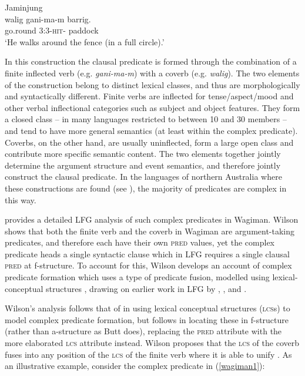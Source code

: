 \documentclass[output=paper,hidelinks]{langscibook}
\begin{document}
\ea \label{walk} Jaminjung\\
\gll walig gani-ma-m barrig.\\
{go.round} {3\SG:3\SG-\textsc{hit}-\PRS} {paddock}\\
\glt `He walks around the fence (in a full circle).' \citep[4]{Schulze-Berndt2000}
\z
	
In this construction the clausal predicate is formed through the combination of a finite inflected verb (e.g. {\it gani-ma-m}) with a coverb (e.g. {\it walig}). The two elements of the construction belong to distinct lexical classes, and thus are morphologically and syntactically different. Finite verbs are inflected for tense{\slash}aspect{\slash}mood and other verbal inflectional categories such as subject and object features. They form a closed class – in many languages restricted to between 10 and 30 members – and tend to have more general semantics (at least within the complex predicate). Coverbs, on the other hand, are usually uninflected, form a large open class and contribute more specific semantic content. The two elements together jointly determine the argument structure and event semantics, and therefore jointly construct the clausal predicate. In the languages of northern Australia where these constructions are found (see \citealt{Bowern14}), the majority of predicates are complex in this way.

\citet{Wilson1999} provides a detailed LFG analysis of such complex predicates in Wagiman. Wilson shows that both the finite verb and the coverb in Wagiman are argument-taking predicates, and therefore each have their own \textsc{pred} values, yet the complex predicate heads a single syntactic clause which in LFG requires a single clausal \textsc{pred} at f-structure.  To account for this, Wilson develops an account of complex predicate formation which uses a type of predicate fusion, modelled using lexical-conceptual structures \citep{jackendoff1990semantic}, drawing on earlier work in LFG by \citet{Alsina:PhD,alsina1996the-role}, \citet{Butt1995,Butt1997}, \citet{MohananT1994,MohananT1997} and \citet{AndrewsManning1999}.


\largerpage[2]
Wilson's analysis follows that of \citet{Butt1995,Butt1997} in using lexical conceptual structures (\textsc{lcs}s) to model complex predicate formation, but follows \citet{AndrewsManning1999} in locating these in f-structure (rather than a-structure as Butt does), replacing the \textsc{pred} attribute with the more elaborated \textsc{lcs} attribute instead. Wilson proposes that the \textsc{lcs} of the coverb fuses into any position of the \textsc{lcs} of the finite verb where it is able to unify \citep[142]{Wilson1999}. As an illustrative example, consider the complex predicate in (\ref{wagiman1}): 
\end{document}
